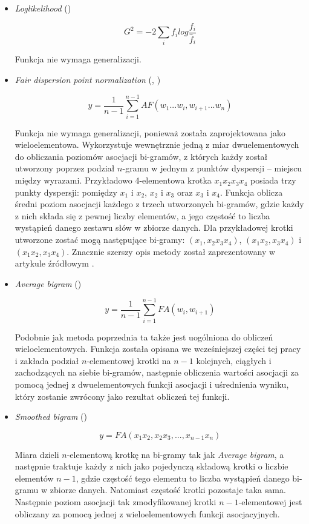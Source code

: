 \documentclass[11pt,a4paper]{llncs}
\begin{document}
\begin{itemize}
\item \emph{Loglikelihood} (\cite[str. 18]{pecina_measures})

$$ G^{2} = -2\sum_{i}f_{i}log\frac{f_{i}}{\hat{f}_{i}} $$

Funkcja nie wymaga generalizacji.
	

\item \emph{Fair dispersion point normalization} (\cite{fdpn}, \cite[str. 5]{generalization_patterns})

$$ y = \frac{1}{n-1} \sum^{n-1}_{i=1}AF(w_{1} ... w_{i}, w_{i+1} ... w_{n}) $$

 
Funkcja nie wymaga generalizacji, ponieważ została zaprojektowana jako wieloelementowa.
Wykorzystuje wewnętrznie jedną z miar dwuelementowych do obliczania poziomów asocjacji bi-gramów, z których każdy został utworzony poprzez podział $n$-gramu w jednym z punktów dyspersji -- miejscu między wyrazami.
Przykładowo 4-elementowa krotka \( x_{1}x_{2}x_{3}x_{4} \) posiada trzy punkty dyspersji: pomiędzy \( x_{1} \) i \( x_{2} \), \( x_{2} \) i \( x_{3} \) oraz \( x_{3} \) i \( x_{4} \).
Funkcja oblicza średni poziom asocjacji każdego z trzech utworzonych bi-gramów, gdzie każdy z nich składa się z pewnej liczby elementów, a jego częstość to liczba wystąpień danego zestawu słów w zbiorze danych.
Dla przykładowej krotki utworzone zostać mogą następujące bi-gramy: \( (x_{1}, x_{2}x_{3}x_{4}) \), \( (x_{1}x_{2}, x_{3}x_{4}) \) i \( (x_{1}x_{2}, x_{3}x_{4}) \).
Znacznie szerszy opis metody został zaprezentowany w artykule źródłowym \cite{fdpn}.


\item \emph{Average bigram} (\cite[str. 5]{generalization_patterns})

$$ y = \frac{1}{n-1} \sum^{n-1}_{i=1}FA(w_{i}, w_{i+1}) $$
 
Podobnie jak metoda poprzednia ta także jest uogólniona do obliczeń wieloelementowych.
Funkcja została opisana we wcześniejszej części tej pracy i zakłada podział $n$-elementowej krotki na \( n - 1 \) kolejnych, ciągłych i zachodzących na siebie bi-gramów, następnie obliczenia wartości asocjacji za pomocą jednej z dwuelementowych funkcji asocjacji i uśrednienia wyniku, który zostanie zwrócony jako rezultat obliczeń tej funkcji.


\item \emph{Smoothed bigram} (\cite[str. 5]{generalization_patterns})


$$ y = FA(x_{1}x_{2}, x_{2}x_{3}, ..., x_{n - 1}x_{n}) $$


Miara dzieli $n$-elementową krotkę na bi-gramy tak jak \emph{Average bigram}, a następnie traktuje każdy z nich jako pojedynczą składową krotki o liczbie elementów \( n -1 \), gdzie częstość tego elementu to liczba wystąpień danego bi-gramu w zbiorze danych.
Natomiast częstość krotki pozostaje taka sama.
Następnie poziom asocjacji tak zmodyfikowanej krotki \(n-1\)-elementowej jest obliczany za pomocą jednej z wieloelementowych funkcji asocjacyjnych.



\end{itemize}
\end{document}
